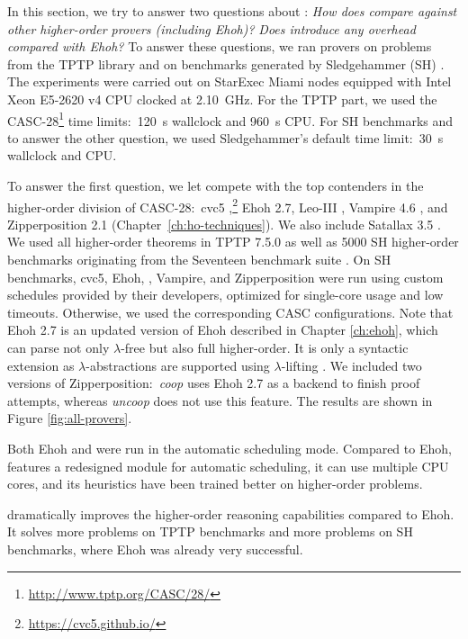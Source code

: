   In this section, we try to answer two questions about \ehohii{}: \emph{How does
  \ehohii{} compare against other higher-order provers (including Ehoh)?} \emph{Does
  \ehohii{} introduce any overhead compared with Ehoh?} To answer
  these questions, we ran provers on problems from the TPTP library \cite{gs-17-tptp} and on
  benchmarks generated by Sledgehammer (SH) \cite{pb-12-sh}.
  The experiments were carried out on StarExec Miami
  \cite{sst-14-starexec} nodes equipped with Intel Xeon E5-2620 v4 CPU clocked at
  2.10~GHz. For the TPTP part, we used the CASC-28\footnote{\url{http://www.tptp.org/CASC/28/}} time limits:\ 120~s
  wallclock and 960~s CPU. For SH benchmarks and to answer the other question, we used Sledgehammer's
  default time limit:\ 30~s wallclock and CPU.
  
  To answer the first question, we let
  \ehohii{} compete with the top contenders in the higher-order division of
  CASC-28:\ cvc5 ,\footnote{\url{https://cvc5.github.io/}}
  Ehoh 2.7, Leo-III  \cite{sb-21-leo3}, Vampire 4.6
  \cite{br-20-full-sup-w-combs}, and Zipperposition 2.1 (Chapter~\ref{ch:ho-techniques}). 
  We also include Satallax 3.5
  \cite{cb-12-satallax}. We used all  higher-order
  theorems in TPTP 7.5.0 as well as 5000 SH higher-order benchmarks
  originating from the Seventeen benchmark suite \cite{desharnais-et-al-202x}.
  On SH benchmarks,
  cvc5, Ehoh, \ehohii{}, Vampire, and Zipperposition were run using custom schedules provided by
  their developers, optimized for single-core usage and low timeouts.
  Otherwise, we used the corresponding CASC configurations.
  Note that Ehoh 2.7 is an updated version of Ehoh described in Chapter
  \ref{ch:ehoh}, which can parse not only $\lambda$-free but also full
  higher-order. It is only a syntactic extension as $\lambda$-abstractions are supported using $\lambda$-lifting \cite{rjmh-82-lifting}.
  We included two versions of Zipperposition:\ \emph{coop} uses Ehoh 2.7 as a backend to finish proof attempts,
  whereas \emph{uncoop} does not use this feature. The results
  are shown in Figure \ref{fig:all-provers}.
  
  Both Ehoh and \ehohii{} were run in the automatic scheduling mode. Compared to Ehoh,
  \ehohii{} features a redesigned module for automatic scheduling, it
  can use multiple CPU cores, and its heuristics have been trained better on higher-order problems.
  
  \ehohii{} dramatically improves the higher-order reasoning capabilities
  compared to Ehoh. It solves  more problems on TPTP benchmarks
  and  more problems on SH benchmarks, where Ehoh was already very
  successful.
  
